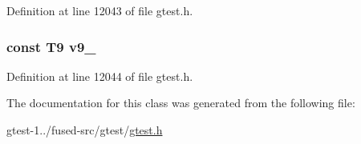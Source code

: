 \-Definition at line 12043 of file gtest.\-h.

\hypertarget{classtesting_1_1internal_1_1ValueArray34_a6356e16cf54a9dfac8525f20242af31e}{
\subsubsection[{v9\-\_\-}]{\setlength{\rightskip}{0pt plus 5cm}const \-T9 {\bf v9\-\_\-}}}\label{dc/de9/classtesting_1_1internal_1_1ValueArray34_a6356e16cf54a9dfac8525f20242af31e}


\-Definition at line 12044 of file gtest.\-h.



\-The documentation for this class was generated from the following file\-:\begin{DoxyCompactItemize}
\item 
gtest-\/1../fused-\/src/gtest/\hyperlink{fused-src_2gtest_2gtest_8h}{gtest.\-h}\end{DoxyCompactItemize}
